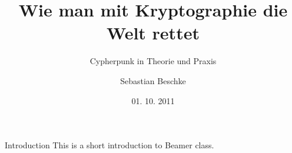 \documentclass{beamer}
\title{Wie man mit Kryptographie die Welt rettet}
\subtitle{Cypherpunk in Theorie und Praxis}
\author{Sebastian Beschke}
\institute{Chaostreff Tübingen}
\date{01. 10. 2011}
\begin{document}
\begin{frame}
\titlepage
\end{frame}


\begin{frame}{Introduction}
This is a short introduction to Beamer class.
\end{frame}
\end{document}
